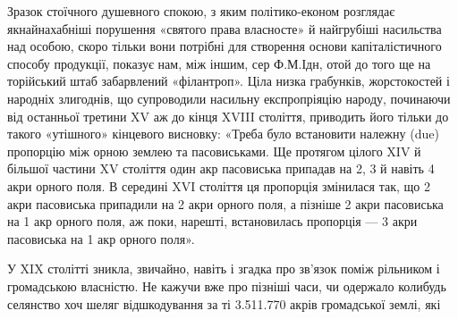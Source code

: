 Зразок стоїчного душевного спокою, з яким політико-економ
розглядає якнайнахабніші порушення «святого права власносте»
й найгрубіші насильства над особою, скоро тільки вони
потрібні для створення основи капіталістичного способу продукції,
показує нам, між іншим, сер Ф.М.Ідн, отой до того
ще на торійський штаб забарвлений «філантроп». Ціла низка грабунків,
жорстокостей і народніх злигоднів, що супроводили насильну
експропріяцію народу, починаючи від останньої третини
XV аж до кінця XVIII століття, приводить його тільки до
такого «утішного» кінцевого висновку: «Треба було встановити
належну (due) пропорцію між орною землею та пасовиськами.
Ще протягом цілого XIV й більшої частини XV століття
один акр пасовиська припадав на 2, 3 й навіть 4 акри орного
поля. В середині XVI століття ця пропорція змінилася так, що
2 акри пасовиська припадили на 2 акри орного поля, а пізніше
2 акри пасовиська на 1 акр орного поля, аж поки, нарешті, встановилась
пропорція — 3 акри пасовиська на 1 акр орного поля».

У XIX столітті зникла, звичайно, навіть і згадка про зв’язок
поміж рільником і громадською власністю. Не кажучи вже
про пізніші часи, чи одержало колибудь селянство хоч шеляг
відшкодування за ті 3.511.770 акрів громадської землі, які
\parbreak{}  %
